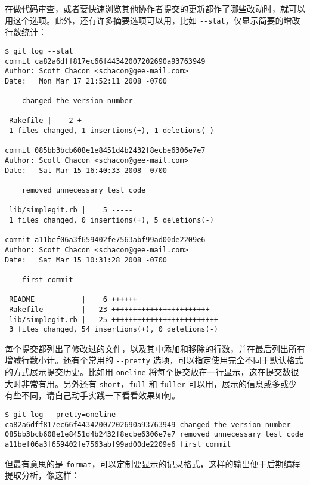 \documentclass[a4paper]{book}
\begin{document}
在做代码审查，或者要快速浏览其他协作者提交的更新都作了哪些改动时，就可以用这个选项。此外，还有许多摘要选项可以用，比如 \texttt{-{}-stat}，仅显示简要的增改行数统计：

\begin{shaded}\begin{verbatim}
$ git log --stat 
commit ca82a6dff817ec66f44342007202690a93763949
Author: Scott Chacon <schacon@gee-mail.com>
Date:   Mon Mar 17 21:52:11 2008 -0700

    changed the version number

 Rakefile |    2 +-
 1 files changed, 1 insertions(+), 1 deletions(-)

commit 085bb3bcb608e1e8451d4b2432f8ecbe6306e7e7
Author: Scott Chacon <schacon@gee-mail.com>
Date:   Sat Mar 15 16:40:33 2008 -0700

    removed unnecessary test code

 lib/simplegit.rb |    5 -----
 1 files changed, 0 insertions(+), 5 deletions(-)

commit a11bef06a3f659402fe7563abf99ad00de2209e6
Author: Scott Chacon <schacon@gee-mail.com>
Date:   Sat Mar 15 10:31:28 2008 -0700

    first commit

 README           |    6 ++++++
 Rakefile         |   23 +++++++++++++++++++++++
 lib/simplegit.rb |   25 +++++++++++++++++++++++++
 3 files changed, 54 insertions(+), 0 deletions(-)
\end{verbatim}\end{shaded}

每个提交都列出了修改过的文件，以及其中添加和移除的行数，并在最后列出所有增减行数小计。还有个常用的 \texttt{-{}-pretty} 选项，可以指定使用完全不同于默认格式的方式展示提交历史。比如用 \texttt{oneline} 将每个提交放在一行显示，这在提交数很大时非常有用。另外还有 \texttt{short}，\texttt{full} 和 \texttt{fuller} 可以用，展示的信息或多或少有些不同，请自己动手实践一下看看效果如何。

\begin{shaded}\begin{verbatim}
$ git log --pretty=oneline
ca82a6dff817ec66f44342007202690a93763949 changed the version number
085bb3bcb608e1e8451d4b2432f8ecbe6306e7e7 removed unnecessary test code
a11bef06a3f659402fe7563abf99ad00de2209e6 first commit
\end{verbatim}\end{shaded}

但最有意思的是 \texttt{format}，可以定制要显示的记录格式，这样的输出便于后期编程提取分析，像这样：
\end{document}
